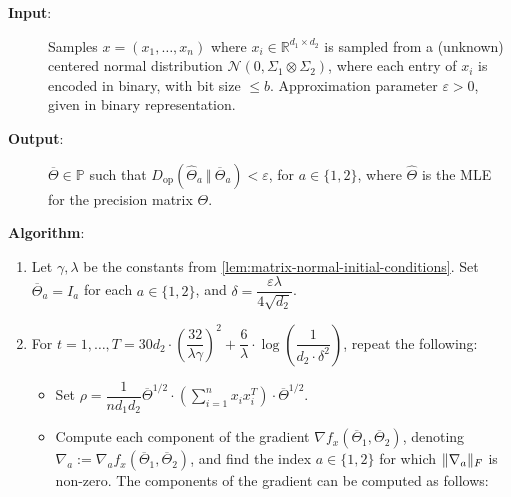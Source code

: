 \documentclass[aos]{imsart}
\theoremstyle{definition}
\numberwithin{equation}{section}
\DeclarePairedDelimiter{\norm}{\lVert}{\rVert}
\newcommand{\R}{{\mathbb{R}}}
\newcommand{\otheta}{\overline{\Theta}}
\newcommand{\htheta}{\widehat{\Theta}}
\newcommand{\ot}{\otimes}
\newcommand{\eps}{\varepsilon}
\newcommand{\cN}{\mathcal{N}}
\newcommand{\SPD}{\mathbb{P}}
\newcommand{\samp}{x}
\newcommand{\Dop}{D_{\operatorname{op}}}
\begin{document}
\begin{Algorithm}
\begin{description}
\item[\hspace{.2cm}\textbf{Input}:] Samples $\samp = (\samp_1, \ldots, \samp_n)$ where $\samp_i \in \R^{d_1 \times d_2}$ is sampled from a (unknown) centered normal distribution $\cN(0, \Sigma_1 \ot \Sigma_2)$, where each entry of $\samp_i$ is encoded in binary, with bit size $\le b$. Approximation parameter $\eps > 0$, given in binary representation. \\[.3ex]

\item[\hspace{.2cm}\textbf{Output}:] $\otheta \in \SPD$ such that $\Dop(\htheta_a \ \Vert  \  \otheta_a) < \eps$, for $a \in \{1,2\}$, where $\htheta$ is the MLE for the precision matrix $\Theta$. \\[.3ex]

\item[\hspace{.2cm}\textbf{Algorithm}:]
\end{description}
\begin{enumerate}
\item\label{it:flip-flop step 1 matrix} Let $\gamma, \lambda$ be the constants from \cref{lem:matrix-normal-initial-conditions}. Set $\otheta_a = I_a$ for each $a \in \{1,2\}$, and $\delta = \dfrac{\eps \lambda}{4 \sqrt{d_2}}$.

\vspace{5pt}

\item\label{it:flip-flop step 2 matrix} For $t=1,\dots,T = 30 d_2 \cdot \left( \dfrac{32}{\lambda \gamma} \right)^2 + \dfrac{6}{\lambda} \cdot \log\left( \dfrac{1}{d_2 \cdot \delta^2} \right)$, repeat the following:

\vspace{5pt}

\begin{itemize}
\item Set $\rho = \dfrac{1}{n d_1 d_2} \otheta^{1/2} \cdot \left( \sum_{i=1}^n x_i x_i^T \right) \cdot \otheta^{1/2}$.

\item Compute each component of the gradient $\nabla f_{\samp}(\otheta_1, \otheta_2)$, denoting $\nabla_a := \nabla_a f_{\samp}(\otheta_1, \otheta_2)$, and find the index $a \in \{1,2\}$ for which $\norm{\nabla_a}_{F}$ is non-zero.
The components of the gradient can be computed as follows:


\end{itemize}
\end{enumerate}
\end{Algorithm}
\end{document}
